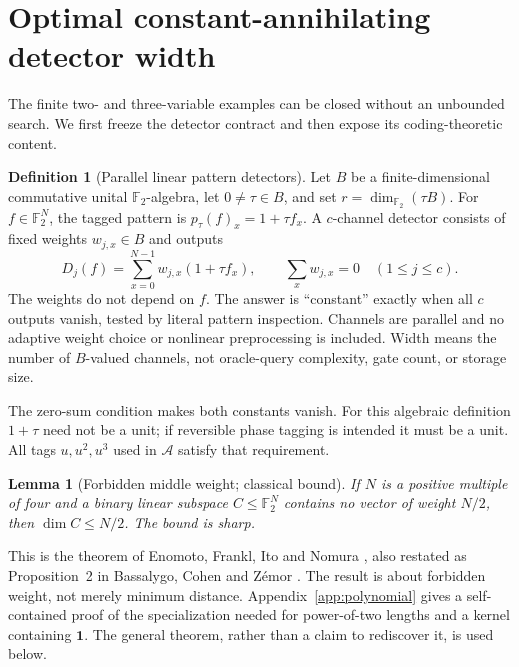 \documentclass[11pt,a4paper]{article}
\newtheorem{lemma}[theorem]{Lemma}
\theoremstyle{definition}\newtheorem{definition}[theorem]{Definition}
\theoremstyle{remark}\newtheorem{remark}[theorem]{Remark}
\newcommand{\F}{\mathbb F}
\newcommand{\A}{\mathcal A}
\numberwithin{equation}{section}
\begin{document}
\section{Optimal constant-annihilating detector width}\label{sec:detectors}
The finite two- and three-variable examples can be closed without an unbounded search. We first freeze the detector contract and then expose its coding-theoretic content.

\begin{definition}[Parallel linear pattern detectors]\label{def:detector}
Let $B$ be a finite-dimensional commutative unital $\F_2$-algebra, let $0\ne\tau\in B$, and set $r=\dim_{\F_2}(\tau B)$. For $f\in\F_2^N$, the tagged pattern is $p_\tau(f)_x=1+\tau f_x$. A $c$-channel detector consists of fixed weights $w_{j,x}\in B$ and outputs
\begin{equation}\label{eq:detector}
 D_j(f)=\sum_{x=0}^{N-1}w_{j,x}(1+\tau f_x),\qquad
 \sum_xw_{j,x}=0\quad(1\le j\le c).
\end{equation}
The weights do not depend on $f$. The answer is ``constant'' exactly when all $c$ outputs vanish, tested by literal pattern inspection. Channels are parallel and no adaptive weight choice or nonlinear preprocessing is included. Width means the number of $B$-valued channels, not oracle-query complexity, gate count, or storage size.
\end{definition}
The zero-sum condition makes both constants vanish. For this algebraic definition $1+\tau$ need not be a unit; if reversible phase tagging is intended it must be a unit. All tags $u,u^2,u^3$ used in $\A$ satisfy that requirement.

\begin{lemma}[Forbidden middle weight; classical bound]\label{lem:code}
If $N$ is a positive multiple of four and a binary linear subspace $C\le\F_2^N$ contains no vector of weight $N/2$, then $\dim C\le N/2$. The bound is sharp.
\end{lemma}
This is the theorem of Enomoto, Frankl, Ito and Nomura \cite{EFIN}, also restated as Proposition~2 in Bassalygo, Cohen and Z\'emor \cite{BCZ}. The result is about forbidden weight, not merely minimum distance. Appendix~\ref{app:polynomial} gives a self-contained proof of the specialization needed for power-of-two lengths and a kernel containing $\mathbf1$. The general theorem, rather than a claim to rediscover it, is used below.
\end{document}
